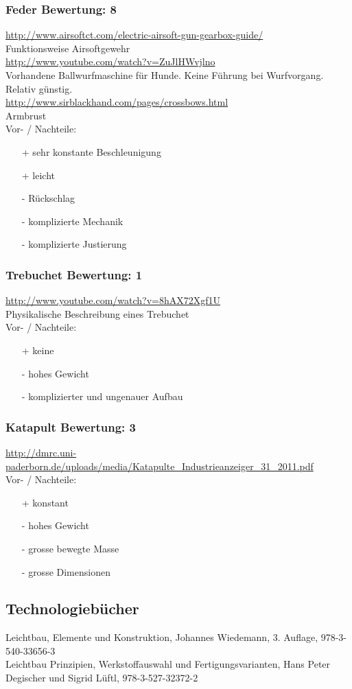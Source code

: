 \subsubsection{Feder \hfill Bewertung: 8}
\url{http://www.airsoftct.com/electric-airsoft-gun-gearbox-guide/} \\
Funktionsweise Airsoftgewehr \\
\url{http://www.youtube.com/watch?v=ZuJlHWvjlno} \\
Vorhandene Ballwurfmaschine für Hunde. Keine Führung bei Wurfvorgang. Relativ günstig. \\
\url{http://www.sirblackhand.com/pages/crossbows.html} \\
Armbrust \\
Vor- / Nachteile:
\begin{itemize}
    \item[+] sehr konstante Beschleunigung
    \item[+] leicht
    \item[-] Rückschlag
    \item[-] komplizierte Mechanik
    \item[-] komplizierte Justierung
\end{itemize}

\subsubsection{Trebuchet \hfill Bewertung: 1}
\url{http://www.youtube.com/watch?v=8hAX72Xgf1U} \\
Physikalische Beschreibung eines Trebuchet \\
Vor- / Nachteile:
\begin{itemize}
    \item[+] keine
    \item[-] hohes Gewicht
    \item[-] komplizierter und ungenauer Aufbau
\end{itemize}

\subsubsection{Katapult \hfill Bewertung: 3}
\url{http://dmrc.uni-paderborn.de/uploads/media/Katapulte_Industrieanzeiger_31_2011.pdf} \\
Vor- / Nachteile:
\begin{itemize}
    \item[+] konstant
    \item[-] hohes Gewicht
    \item[-] grosse bewegte Masse
    \item[-] grosse Dimensionen
\end{itemize}

\subsection{Technologiebücher}
Leichtbau, Elemente und Konstruktion, Johannes Wiedemann, 3. Auflage, 
978-3-540-33656-3 \\
Leichtbau Prinzipien, Werkstoffauswahl und Fertigungsvarianten, Hans Peter Degischer und Sigrid Lüftl, 978-3-527-32372-2

